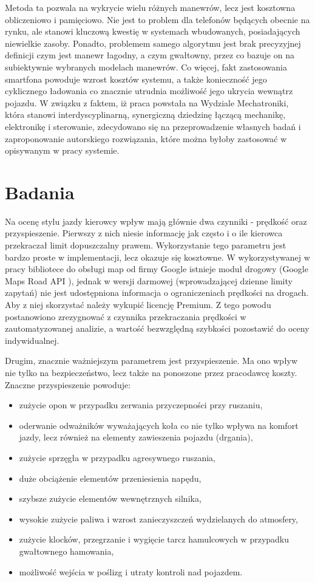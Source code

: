 Metoda ta pozwala na wykrycie wielu różnych manewrów, lecz jest kosztowna obliczeniowo i pamięciowo. Nie jest to problem dla telefonów będących obecnie na rynku, ale stanowi kluczową kwestię w systemach wbudowanych, posiadających niewielkie zasoby. Ponadto, problemem samego algorytmu jest brak precyzyjnej definicji czym jest manewr łagodny, a czym gwałtowny, przez co bazuje on na subiektywnie wybranych modelach manewrów. Co więcej, fakt zastosowania smartfona powoduje wzrost kosztów systemu, a także konieczność jego cyklicznego ładowania co znacznie utrudnia możliwość jego ukrycia wewnątrz pojazdu.
W związku z faktem, iż praca powstała na Wydziale Mechatroniki, która stanowi interdyscyplinarną, synergiczną dziedzinę łączącą mechanikę, elektronikę i sterowanie, zdecydowano się na przeprowadzenie własnych badań i zaproponowanie autorskiego rozwiązania, które można byłoby zastosować w opisywanym w pracy systemie.

\section{Badania}
\label{experiments}

Na ocenę stylu jazdy kierowcy wpływ mają głównie dwa czynniki - prędkość oraz przyspieszenie. Pierwszy z nich niesie informację jak często i o ile kierowca przekraczał limit dopuszczalny prawem. Wykorzystanie tego parametru jest bardzo proste w implementacji, lecz okazuje się kosztowne. W wykorzystywanej w pracy bibliotece do obsługi map od firmy Google istnieje moduł drogowy (Google Maps Road API \cite{google_map_road_api}), jednak w wersji darmowej (wprowadzającej dzienne limity zapytań) nie jest udostępniona informacja o ograniczeniach prędkości na drogach. Aby z niej skorzystać należy wykupić licencję Premium. Z tego powodu postanowiono zrezygnować z czynnika przekraczania prędkości w zautomatyzowanej analizie, a wartość bezwzględną szybkości pozostawić do oceny indywidualnej.

Drugim, znacznie ważniejszym parametrem jest przyspieszenie. Ma ono wpływ nie tylko na bezpieczeństwo, lecz także na ponoszone przez pracodawcę koszty. Znaczne przyspieszenie powoduje:

\begin{itemize}
\item zużycie opon w przypadku zerwania przyczepności przy ruszaniu,
\item oderwanie odważników wyważających koła co nie tylko wpływa na komfort jazdy, lecz również na elementy zawieszenia pojazdu (drgania),
\item zużycie sprzęgła w przypadku agresywnego ruszania,
\item duże obciążenie elementów przeniesienia napędu,
\item szybsze zużycie elementów wewnętrznych silnika,
\item wysokie zużycie paliwa i wzrost zanieczyszczeń wydzielanych do atmosfery,
\item zużycie klocków, przegrzanie i wygięcie tarcz hamulcowych w przypadku gwałtownego hamowania,
\item możliwość wejścia w poślizg i utraty kontroli nad pojazdem.
\end{itemize}

